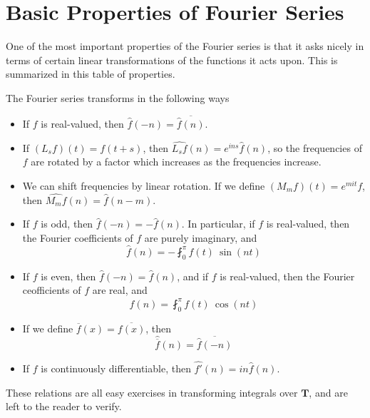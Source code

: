 \section{Basic Properties of Fourier Series}

One of the most important properties of the Fourier series is that it asks nicely in terms of certain linear transformations of the functions it acts upon. This is summarized in this table of properties.

\begin{theorem}
    The Fourier series transforms in the following ways
    \begin{itemize}
        \item If $f$ is real-valued, then $\widehat{f}(-n) = \overline{\widehat{f}(n)}$.

        \item If $(L_s f)(t) = f(t+s)$, then $\widehat{L_s f}(n) = e^{ins} \widehat{f}(n)$, so the frequencies of $f$ are rotated by a factor which increases as the frequencies increase.

        \item We can shift frequencies by linear rotation. If we define $(M_m f)(t) = e^{mit} f$, then $\widehat{M_m f}(n) = \widehat{f}(n - m)$.

        \item If $f$ is odd, then $\widehat{f}(-n) = -\widehat{f}(n)$. In particular, if $f$ is real-valued, then the Fourier coefficients of $f$ are purely imaginary, and
        \[ \widehat{f}(n) = - \fint_0^\pi f(t)\ \sin(nt) \]

        \item If $f$ is even, then $\widehat{f}(-n) = \widehat{f}(n)$, and if $f$ is real-valued, then the Fourier ceofficients of $f$ are real, and
        \[ \widehat{f}(n) = \fint_0^\pi f(t)\ \cos(nt) \]

        \item If we define $\overline{f}(x) = \overline{f(x)}$, then
        \[ \widehat{\overline{f}}(n) = \overline{\widehat{f}(-n)} \]

        \item If $f$ is continuously differentiable, then $\widehat{f'}(n) = in \widehat{f}(n)$.
    \end{itemize}
\end{theorem}

These relations are all easy exercises in transforming integrals over $\mathbf{T}$, and are left to the reader to verify.

